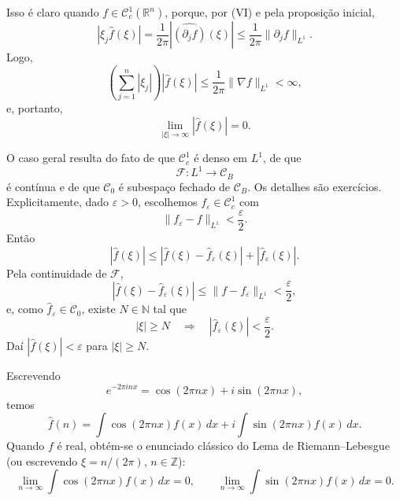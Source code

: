 \documentclass[../distribution_theory_notes.tex]{subfiles}
\begin{document}
\begin{proof*}
	Isso é claro quando $f\in\mathcal{C}_{c}^{1}(\mathbb{R}^{n})$, porque, por (VI) e pela proposição inicial,
	\[
		|\xi_{j}\widehat f(\xi)|
		=\frac{1}{2\pi}
		\left|\widehat{\left(\partial_{j}f\right)}(\xi)\right|
		\leq\frac{1}{2\pi}\|\partial_{j}f\|_{L^{1}}.
	\]
	Logo,
	\[
		\left(\sum_{j=1}^{n}|\xi_{j}|\right)|\widehat f(\xi)|
		\leq\frac{1}{2\pi}\|\nabla f\|_{L^{1}}<\infty,
	\]
	e, portanto,
	\[
		\lim_{|\xi|\to\infty}|\widehat f(\xi)|=0.
	\]

	O caso geral resulta do fato de que $\mathcal{C}_{c}^{1}$ é denso em $L^{1}$, de que
	\[
		\mathcal{F}:L^{1}\longrightarrow\mathcal{C}_{B}
	\]
	é contínua e de que $\mathcal{C}_{0}$ é subespaço fechado de $\mathcal{C}_{B}$. Os detalhes são exercícios. Explicitamente, dado $\varepsilon>0$, escolhemos $f_{\varepsilon}\in\mathcal{C}_{c}^{1}$ com
	\[
		\|f_{\varepsilon}-f\|_{L^{1}}<\frac{\varepsilon}{2}.
	\]
	Então
	\[
		|\widehat f(\xi)|
		\leq
		|\widehat f(\xi)-\widehat f_{\varepsilon}(\xi)|
		+|\widehat f_{\varepsilon}(\xi)|.
	\]
	Pela continuidade de $\mathcal{F}$,
	\[
		|\widehat f(\xi)-\widehat f_{\varepsilon}(\xi)|
		\leq \|f-f_{\varepsilon}\|_{L^{1}}
		<\frac{\varepsilon}{2},
	\]
	e, como $\widehat f_{\varepsilon}\in\mathcal{C}_{0}$, existe $N\in\mathbb{N}$ tal que
	\[
		|\xi|\geq N
		\quad\Longrightarrow\quad
		|\widehat f_{\varepsilon}(\xi)|<\frac{\varepsilon}{2}.
	\]
	Daí $|\widehat f(\xi)|<\varepsilon$ para $|\xi|\geq N$. \qedsymbol
\end{proof*}

\begin{tcolorbox}[
		skin=enhanced,
		title=Observação,
		fonttitle=\bfseries,
		colframe=black,
		colbacktitle=cyan!75!white,
		colback=cyan!15,
		colbacklower=black,
		coltitle=black,
		drop fuzzy shadow,
	]
	Escrevendo
	\[
		e^{-2\pi i n x}=\cos(2\pi n x)+i\sin(2\pi n x),
	\]
	temos
	\[
		\widehat f(n)
		=\int\cos(2\pi n x)f(x)\,dx
		+i\int\sin(2\pi n x)f(x)\,dx.
	\]
	Quando $f$ é real, obtém-se o enunciado clássico do Lema de Riemann--Lebesgue (ou escrevendo $\xi=n/(2\pi)$, $n\in\mathbb{Z}$):
	\[
		\lim_{n\to\infty}\int\cos(2\pi n x)f(x)\,dx=0,
		\qquad
		\lim_{n\to\infty}\int\sin(2\pi n x)f(x)\,dx=0.
	\]
\end{tcolorbox}
\end{document}
